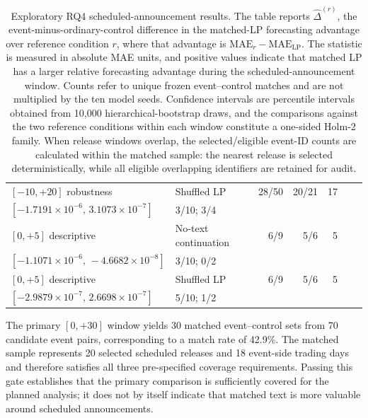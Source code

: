 \begin{table}[htbp]
{\begin{tabular}{@{}llrrrcc@{}}
$[-10,+20]$ robustness
& Shuffled LP
& 28/50
& 20/21
& 17
& \shortstack{$-5.7130\times10^{-7}$\\[-0.2ex]
{\scriptsize $[-1.7191\times10^{-6},\,3.1073\times10^{-7}]$}}
& 3/10; 3/4
\\

\addlinespace
$[0,+5]$ descriptive
& No-text continuation
& 6/9
& 5/6
& 5
& \shortstack{$-4.7846\times10^{-7}$\\[-0.2ex]
{\scriptsize $[-1.1071\times10^{-6},\,-4.6682\times10^{-8}]$}}
& 3/10; 0/2
\\

$[0,+5]$ descriptive
& Shuffled LP
& 6/9
& 5/6
& 5
& \shortstack{$1.1263\times10^{-8}$\\[-0.2ex]
{\scriptsize $[-2.9879\times10^{-7},\,2.6698\times10^{-7}]$}}
& 5/10; 1/2
\\
\bottomrule
\end{tabular}%
}

\caption{Exploratory RQ4 scheduled-announcement results.  The table reports
$\widehat{\Delta}^{(r)}$, the event-minus-ordinary-control difference in the
matched-LP forecasting advantage over reference condition $r$, where that
advantage is $\mathrm{MAE}_{r}-\mathrm{MAE}_{\mathrm{LP}}$.  The statistic is
measured in absolute MAE units, and positive values indicate that matched LP
has a larger relative forecasting advantage during the scheduled-announcement
window.
Counts refer to unique frozen event--control matches and are not multiplied by
the ten model seeds.  Confidence intervals are percentile intervals obtained
from 10,000 hierarchical-bootstrap draws, and the comparisons against the two
reference conditions within each window constitute a one-sided Holm-2 family.
When release windows overlap, the selected/eligible event-ID counts are calculated
within the matched sample: the nearest release is selected deterministically,
while all eligible overlapping identifiers are retained for audit.}
\label{tab:ch3:rq4_conditional_results}
\end{table}


The primary $[0,+30]$ window yields 30 matched event--control sets from 70
candidate event pairs, corresponding to a match rate of 42.9\%.  The matched
sample represents 20 selected scheduled releases and 18 event-side trading days and therefore satisfies all three pre-specified coverage
requirements.  Passing this gate establishes that the primary comparison is
sufficiently covered for the planned analysis; it does not by itself indicate
that matched text is more valuable around scheduled announcements.

